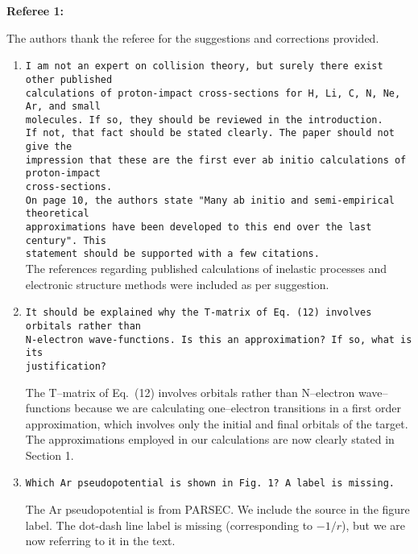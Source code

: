 \documentclass[10pt]{article}
\begin{document}
\noindent
{\bf Referee 1:}

\vspace{0.2cm}
The authors thank the referee for the suggestions and corrections 
provided.

\begin{enumerate}
 \item 
 {\tt I am not an expert on collision theory, but surely there
 exist other published \\ calculations of proton-impact
 cross-sections for H, Li, C, N, Ne, Ar, and small \\ molecules. 
 If so, they should be reviewed in the introduction. \\ If not,
 that fact should be stated clearly. The paper should not give 
 the \\ impression that these are the first ever ab initio
 calculations of proton-impact \\ cross-sections.} \\ 
 {\tt On page 10, the authors state "Many ab initio and 
 semi-empirical theoretical \\ approximations have been developed
 to this end over the last century". This \\ statement should be
 supported with a few citations.} \\
 
 \vspace{-0.25cm}
 The references regarding published calculations of inelastic 
 processes and electronic structure methods were included as per 
 suggestion.
 
 \item {\tt It should be explained why the T-matrix of Eq.~(12) 
 involves orbitals rather than \\  N-electron wave-functions. Is 
 this an approximation? If so, what is its \\ justification?}
 
 The T--matrix of Eq.~(12) involves orbitals rather than 
 N--electron wave--functions because we are calculating one--electron
 transitions in a first order approximation, which involves only the
 initial and final orbitals of the target. The approximations
 employed in our calculations are now clearly stated in 
 Section 1. 
 
 \item {\tt Which Ar pseudopotential is shown in Fig.~1? A label is 
 missing.}
 
 The Ar pseudopotential is from PARSEC. We include the source in 
 the figure label. The dot-dash line label is missing 
 (corresponding to $-1/r$), but we are now referring to it in the
 text. 
 

\end{enumerate}
\end{document}
